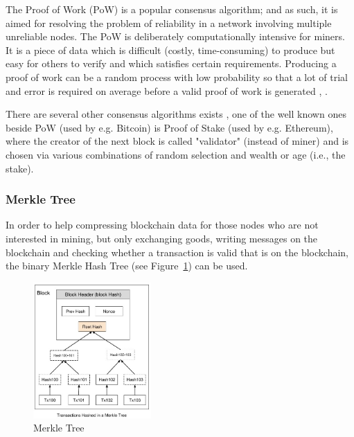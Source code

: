 \documentclass[a4paper]{article}
\begin{document}
The Proof of Work (PoW) is a popular consensus algorithm; and as such, it is aimed for resolving the problem of reliability in a network involving multiple unreliable nodes. The PoW is deliberately computationally intensive for miners. It is a piece of data which is difficult (costly, time-consuming) to produce but easy for others to verify and which satisfies certain requirements. Producing a proof of work can be a random process with low probability so that a lot of trial and error is required on average before a valid proof of work is generated \cite{tutorialspoint}, \cite{bitcoin_wiki}.

There are several other consensus algorithms exists \cite{consensus}, one of the well known ones beside PoW (used by e.g. Bitcoin) is Proof of Stake (used by e.g. Ethereum), where the creator of the next block is called "validator" (instead of miner) and is chosen via various combinations of random selection and wealth or age (i.e., the stake).  

\subsubsection{Merkle Tree}

In order to help compressing blockchain data for those nodes who are not interested in mining, but only exchanging goods, writing messages on the blockchain and checking whether a transaction is valid that is on the blockchain, the binary Merkle Hash Tree (see Figure~\ref{fig:merkle}) can be used.

\begin{figure}[H]
    \centering
    \includegraphics[width=0.4\textwidth]{figures/merkle_tree.jpg}
    \caption{Merkle Tree \cite{tutorialspoint}}
    \label{fig:merkle}
\end{figure}
\end{document}
